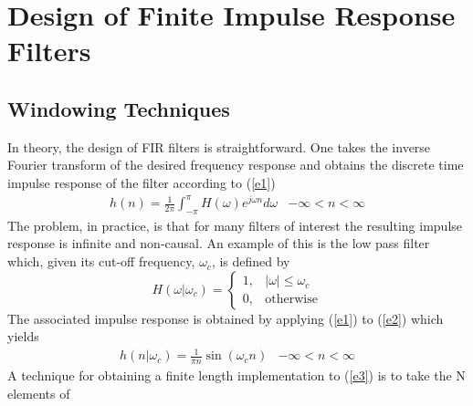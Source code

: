 
\chapter[FIR Filters]{Design of Finite Impulse Response Filters}
\label{fir}
\section{Windowing Techniques} 
\label{s1}

In theory,  the design of FIR filters is straightforward.
One takes the inverse Fourier transform of the desired frequency response
and obtains the discrete time impulse response of the
filter according to (\ref{e1})
%
\begin{equation}
\begin{array}{cc}
h(n)=\displaystyle{\frac{1}{2\pi}\int_{-\pi}^{\pi}
H(\omega)e^{j\omega n}d\omega} 
&  -\infty<n<\infty
\end{array}
\label{e1}
\end{equation}
%
The problem, in practice, is that for many filters of interest
the resulting impulse response is infinite and non-causal.
An example of this is the low pass filter which, given its cut-off
frequency, $\omega_c$,  is defined by
%
\begin{equation}
H(\omega|\omega_c)=\left\{ \begin{array}{ll}
                     1, & \mbox{$|\omega|\leq\omega_c$}\\
                     0, & \mbox{otherwise}
                \end{array}
       \right.
\label{e2}
\end{equation}
%
The associated impulse response is obtained by applying (\ref{e1}) to 
(\ref{e2})
which yields
%
\begin{equation}
\begin{array}{cc}
h(n|\omega_c)={\displaystyle{\frac{1}{\pi n}\sin(\omega_cn)}} &  
-\infty<n<\infty
\end{array}
\label{e3}
\end{equation}
%
A technique for obtaining a finite length
implementation to (\ref{e3}) is to take the N elements of
